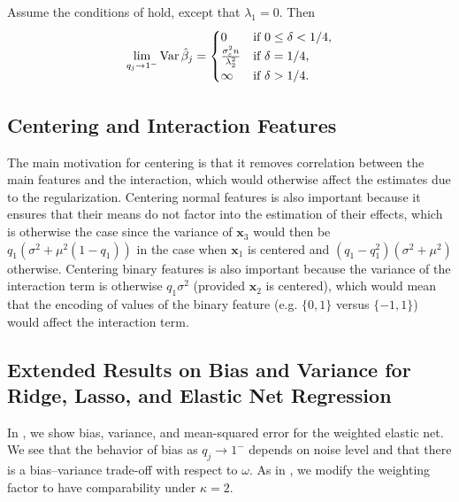 \begin{corollary}
  \label{cor:ridge-variance}
  Assume the conditions of  hold, except that
  \(\lambda_1 = 0\). Then
  \[
    \lim_{q_j \rightarrow 1^-} \operatorname{Var} \hat{\beta}_j =
    \begin{cases}
      0                                          & \text{if } 0 \leq \delta < 1/4, \\
      \frac{\sigma_\varepsilon^2 n}{\lambda_2^2} & \text{if } \delta = 1/4,        \\
      \infty                                     & \text{if } \delta > 1/4.
    \end{cases}
  \]
\end{corollary}

\subsection{Centering and Interaction Features}%
\label{sec:centering-interactions}

The main motivation for centering is that it removes correlation between the main features
and the interaction, which would otherwise affect the estimates due to the regularization.
Centering normal features is also important because it ensures that their means do not
factor into the estimation of their effects, which is otherwise the case since the variance
of \(\bm{x}_3\) would then be \(q_1(\sigma^2 + \mu^2(1 - q_1))\) in the case when
\(\bm{x}_1\) is centered and \((q_1 - q_1^2)(\sigma^2 + \mu^2)\) otherwise. Centering
binary features is also important because the variance of the interaction term is otherwise
\(q_1\sigma^2\) (provided \(\bm{x}_2\) is centered), which would mean that the encoding of
values of the binary feature (e.g. \(\{0,1\}\) versus \(\{-1, 1\}\)) would affect the
interaction term.

\subsection{Extended Results on Bias and Variance for Ridge, Lasso, and Elastic Net Regression}%
\label{sec:additional-results-biasvar}

In , we show bias, variance, and mean-squared error
for the weighted elastic net. We see that the behavior of bias as \(q_j \rightarrow 1^-\)
depends on noise level and that there is a bias--variance trade-off with respect to
\(\omega\). As in , we modify the weighting factor to have
comparability under \(\kappa = 2\).

